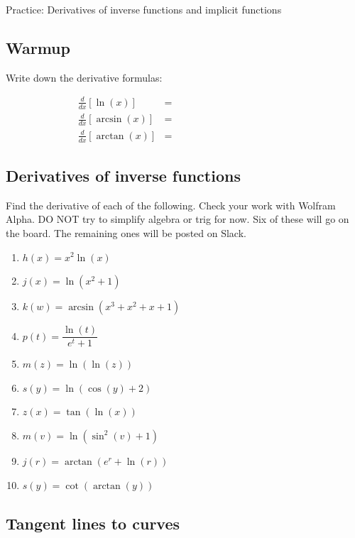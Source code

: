 \documentclass[11pt]{article}
\begin{document}
\begin{center}
    \Large{Practice: Derivatives of inverse functions and implicit functions}
\end{center}

\subsection*{Warmup}

Write down the derivative formulas: 

\begin{align*}
    \frac{d}{dx}\left[\ln(x) \right] &= \hspace{2in} \\
    \frac{d}{dx}\left[\arcsin(x) \right] &= \hspace{2in} \\
    \frac{d}{dx}\left[\arctan(x) \right] &= \hspace{2in}
\end{align*}


\subsection*{Derivatives of inverse functions}

Find the derivative of each of the following. Check your work with Wolfram Alpha. DO NOT try to simplify algebra or trig for now. Six of these will go on the board. The remaining ones will be posted on Slack. 

\begin{enumerate}
    \item $h(x) = x^2 \ln(x)$
    \item $j(x) = \ln(x^2 + 1)$
    \item $k(w) = \arcsin(x^3 + x^2 + x + 1)$
    \item $p(t) = \dfrac{\ln(t)}{e^t + 1}$
    \item $m(z) = \ln(\ln(z))$
    \item $s(y) = \ln(\cos(y) + 2)$
    \item $z(x) = \tan(\ln(x))$
    \item $m(v) = \ln(\sin^2(v) + 1)$
    \item $j(r) = \arctan(e^r + \ln(r))$
    \item $s(y) = \cot(\arctan(y))$
\end{enumerate}

\vspace

\subsection*{Tangent lines to curves}
\end{document}
